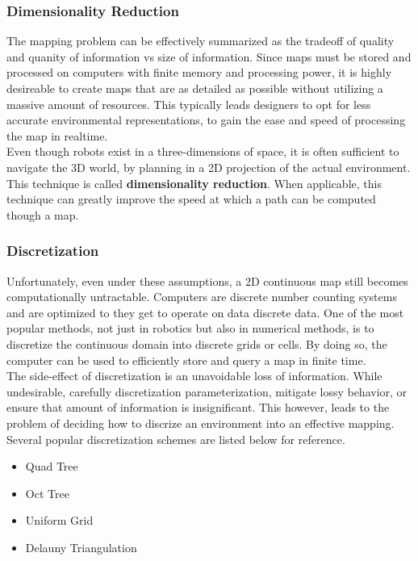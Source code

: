 \documentclass[journal]{IEEEtran}
\begin{document}
\subsubsection{Dimensionality Reduction}
The mapping problem can be effectively summarized as the tradeoff of quality and quanity of information vs size of information. Since maps must be stored and processed on computers with finite memory and processing power, it is highly desireable to create maps that are as detailed as possible without utilizing a massive amount of resources. This typically leads designers to opt for less accurate environmental representations, to gain the ease and speed of processing the map in realtime. \\

Even though robots exist in a three-dimensions of space, it is often sufficient to navigate the 3D world, by planning in a 2D projection of the actual environment. This technique is called \textbf{dimensionality reduction}. When applicable, this technique can greatly improve the speed at which a path can be computed though a map. \\

\subsubsection{Discretization}
Unfortunately, even under these assumptions, a 2D continuous map still becomes computationally untractable. Computers are discrete number counting systems and are optimized to they get to operate on data discrete data. One of the most popular methods, not just in robotics but also in numerical methods, is to discretize the continuous domain into discrete grids or cells. By doing so, the computer can be used to efficiently store and query a map in finite time. \\

The side-effect of discretization is an unavoidable loss of information. While undesirable, carefully discretization parameterization, mitigate lossy behavior, or ensure that amount of information is insignificant. This however, leads to the problem of deciding how to discrize an environment into an effective mapping. Several popular discretization schemes are listed below for reference. \\

\begin{itemize}
  \item Quad Tree 
  \item Oct Tree 
  \item Uniform Grid
  \item Delauny Triangulation \\
\end{itemize}
\end{document}
